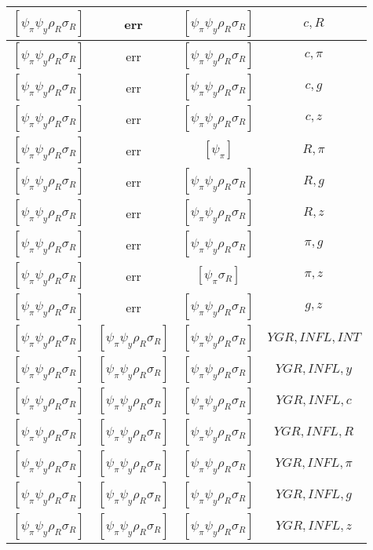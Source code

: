 \documentclass[a4paper,10pt]{article}
\begin{document}
\begin{longtable}{|c|c|c|c|}
\hline
$[\psi_\pi \psi_y \rho_R \sigma_R ]$ & err & $[\psi_\pi \psi_y \rho_R \sigma_R ]$ & ${c},{R}$ \\
\hline
$[\psi_\pi \psi_y \rho_R \sigma_R ]$ & err & $[\psi_\pi \psi_y \rho_R \sigma_R ]$ & ${c},{\pi}$ \\
\hline
$[\psi_\pi \psi_y \rho_R \sigma_R ]$ & err & $[\psi_\pi \psi_y \rho_R \sigma_R ]$ & ${c},{g}$ \\
\hline
$[\psi_\pi \psi_y \rho_R \sigma_R ]$ & err & $[\psi_\pi \psi_y \rho_R \sigma_R ]$ & ${c},{z}$ \\
\hline
$[\psi_\pi \psi_y \rho_R \sigma_R ]$ & err & $[\psi_\pi ]$ & ${R},{\pi}$ \\
\hline
$[\psi_\pi \psi_y \rho_R \sigma_R ]$ & err & $[\psi_\pi \psi_y \rho_R \sigma_R ]$ & ${R},{g}$ \\
\hline
$[\psi_\pi \psi_y \rho_R \sigma_R ]$ & err & $[\psi_\pi \psi_y \rho_R \sigma_R ]$ & ${R},{z}$ \\
\hline
$[\psi_\pi \psi_y \rho_R \sigma_R ]$ & err & $[\psi_\pi \psi_y \rho_R \sigma_R ]$ & ${\pi},{g}$ \\
\hline
$[\psi_\pi \psi_y \rho_R \sigma_R ]$ & err & $[\psi_\pi \sigma_R ]$ & ${\pi},{z}$ \\
\hline
$[\psi_\pi \psi_y \rho_R \sigma_R ]$ & err & $[\psi_\pi \psi_y \rho_R \sigma_R ]$ & ${g},{z}$ \\
\hline
$[\psi_\pi \psi_y \rho_R \sigma_R ]$ & $[\psi_\pi \psi_y \rho_R \sigma_R ]$ & $[\psi_\pi \psi_y \rho_R \sigma_R ]$ & ${YGR},{INFL},{INT}$ \\
\hline
$[\psi_\pi \psi_y \rho_R \sigma_R ]$ & $[\psi_\pi \psi_y \rho_R \sigma_R ]$ & $[\psi_\pi \psi_y \rho_R \sigma_R ]$ & ${YGR},{INFL},{y}$ \\
\hline
$[\psi_\pi \psi_y \rho_R \sigma_R ]$ & $[\psi_\pi \psi_y \rho_R \sigma_R ]$ & $[\psi_\pi \psi_y \rho_R \sigma_R ]$ & ${YGR},{INFL},{c}$ \\
\hline
$[\psi_\pi \psi_y \rho_R \sigma_R ]$ & $[\psi_\pi \psi_y \rho_R \sigma_R ]$ & $[\psi_\pi \psi_y \rho_R \sigma_R ]$ & ${YGR},{INFL},{R}$ \\
\hline
$[\psi_\pi \psi_y \rho_R \sigma_R ]$ & $[\psi_\pi \psi_y \rho_R \sigma_R ]$ & $[\psi_\pi \psi_y \rho_R \sigma_R ]$ & ${YGR},{INFL},{\pi}$ \\
\hline
$[\psi_\pi \psi_y \rho_R \sigma_R ]$ & $[\psi_\pi \psi_y \rho_R \sigma_R ]$ & $[\psi_\pi \psi_y \rho_R \sigma_R ]$ & ${YGR},{INFL},{g}$ \\
\hline
$[\psi_\pi \psi_y \rho_R \sigma_R ]$ & $[\psi_\pi \psi_y \rho_R \sigma_R ]$ & $[\psi_\pi \psi_y \rho_R \sigma_R ]$ & ${YGR},{INFL},{z}$ \\

\end{longtable}
\end{document}
